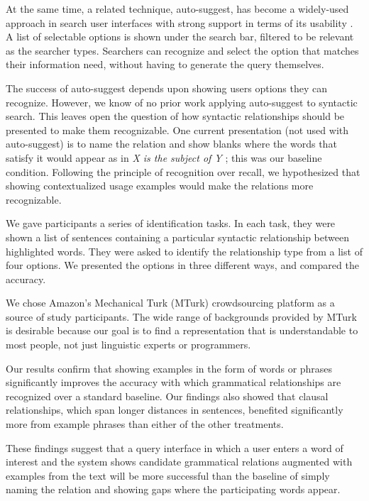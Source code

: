 At the same time, a related technique, auto-suggest, has become a widely-used approach in search user interfaces with strong support in terms of its usability \cite{hearst2009search}. A list of selectable options is shown under the search bar, filtered to be relevant as the searcher types. Searchers can recognize and select the option that matches their information need, without having to generate the query themselves.

The success of auto-suggest depends upon showing users options they can recognize. However, we know of no prior work applying auto-suggest to syntactic search. This leaves open the question of how syntactic relationships should be presented to make them recognizable. One current presentation (not used with auto-suggest) is to name the relation and show blanks where the words that satisfy it would appear as in \emph{X is the subject of Y} \cite{muralidharan2013supporting}; this was our baseline condition. Following the principle of recognition over recall, we hypothesized that showing contextualized usage examples would make the relations more recognizable.

We gave participants a series of identification tasks. In each task, they were shown a list of sentences containing a particular syntactic relationship between highlighted words. They were asked to identify the relationship type from a list of four options. We presented the options in three different ways, and compared the accuracy.

We chose Amazon's Mechanical Turk (MTurk) crowdsourcing platform as a source of study participants. The wide range of backgrounds provided by MTurk is desirable because our goal is to find a representation that is understandable to most people, not just linguistic experts or programmers.

Our results confirm that showing examples in the form of words or phrases significantly improves the accuracy with which grammatical relationships are recognized over a standard baseline.  Our findings also showed that clausal relationships, which span longer distances in sentences, benefited significantly more from example phrases than either of the other treatments.

These findings suggest that a query interface in which a user enters a word of interest and the system shows candidate grammatical relations augmented with examples from the text will be more successful than the baseline of simply naming the relation and showing gaps where the participating words appear.

